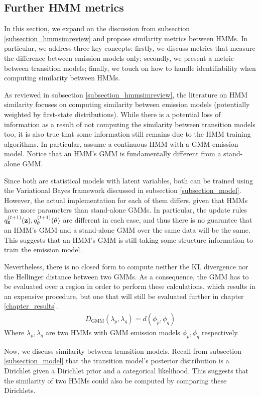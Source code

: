 \documentclass[../main.tex]{subfiles}
\begin{document}
\subsection{Further HMM metrics} \label{subsection_hmmsim}
In this section, we expand on the discussion from subsection \ref{subsection_hmmsimreview} and propose similarity metrics between HMMs. In particular, we address three key concepts: firstly, we discuss metrics that measure the difference between emission models only; secondly, we present a metric between transition models; finally, we touch on how to handle identifiability when computing similarity between HMMs.
\par As reviewed in subsection \ref{subsection_hmmsimreview}, the literature on HMM similarity focuses on computing similarity between emission models (potentially weighted by first-state distributions). While there is a potential loss of information as a result of not computing the similarity between transition models too, it is also true that some information still remains due to the HMM training algorithms. In particular, assume a continuous HMM with a GMM emission model. Notice that an HMM's GMM is fundamentally different from a stand-alone GMM.
\par Since both are statistical models with latent variables, both can be trained using the Variational Bayes framework discussed in subsection \ref{subsection_model}. However, the actual implementation for each of them differs, given that HMMs have more parameters than stand-alone GMMs. In particular, the update rules $q_{\mathbf{z}}^{(t+1)}(\mathbf{z}), q_{\theta}^{(t+1)}(\theta)$ are different in each case, and thus there is no guarantee that an HMM's GMM and a stand-alone GMM over the same data will be the same. This suggests that an HMM's GMM is still taking some structure information to train the emission model.
\par Nevertheless, there is no closed form to compute neither the KL divergence nor the Hellinger distance between two GMMs. As a consequence, the GMM has to be evaluated over a region in order to perform these calculations, which results in an expensive procedure, but one that will still be evaluated further in chapter \ref{chapter_results}.
\begin{align*}
D_{\text{GMM}}(\lambda_p, \lambda_q) = d( \phi_p, \phi_q )
\end{align*}
Where $\lambda_p, \lambda_q$ are two HMMs with GMM emission models $\phi_p, \phi_q$ respectively.
\par Now, we discuss similarity between transition models. Recall from subsection \ref{subsection_model} that the transition model's posterior distribution is a Dirichlet given a Dirichlet prior and a categorical likelihood. This suggests that the similarity of two HMMs could also be computed by comparing these Dirichlets.
\end{document}

